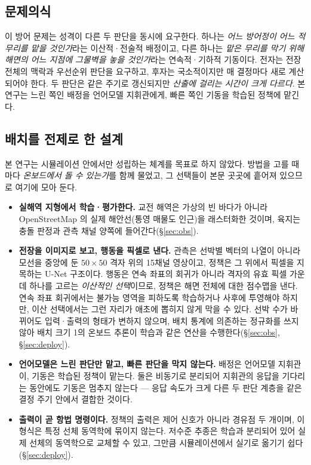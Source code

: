\subsection{문제의식}

이 방어 문제는 성격이 다른 두 판단을 동시에 요구한다. 하나는 \emph{어느 방어정이 어느
적 무리를 맡을 것인가}라는 이산적·전술적 배정이고, 다른 하나는 \emph{맡은 무리를 막기 위해
해면의 어느 지점에 그물벽을 놓을 것인가}라는 연속적·기하적 기동이다. 전자는 전장 전체의
맥락과 우선순위 판단을 요구하고, 후자는 국소적이지만 매 결정마다 새로 계산되어야 한다.
두 판단은 같은 주기로 갱신되지만 \emph{산출에 걸리는 시간이 크게 다르다}. 본 연구는 느린 쪽인 배정을 언어모델 지휘관에게, 빠른 쪽인 기동을 학습된 정책에 맡긴다.

\subsection{배치를 전제로 한 설계}

본 연구는 시뮬레이션 안에서만 성립하는 체계를 목표로 하지 않았다. 방법을 고를 때마다
\emph{온보드에서 돌 수 있는가}를 함께 물었고, 그 선택들이 본문 곳곳에 흩어져 있으므로
여기에 모아 둔다.

\begin{itemize}[leftmargin=*, itemsep=2pt, topsep=3pt]
\item \textbf{실해역 지형에서 학습·평가한다.} 교전 해역은 가상의 빈 바다가 아니라
      OpenStreetMap 의 실제 해안선(통영 매물도 인근)을 래스터화한 것이며, 육지는 충돌
      판정과 관측 채널 양쪽에 들어간다(\S\ref{sec:obs}).
\item \textbf{전장을 이미지로 보고, 행동을 픽셀로 낸다.} 관측은 선박별 벡터의 나열이
      아니라 모선을 중앙에 둔 $50\times50$ 격자 위의 15채널 영상이고, 정책은 그 위에서
      픽셀을 지목하는 U-Net 구조이다. 행동은 연속 좌표의 회귀가 아니라 격자의 유효 픽셀
      가운데 하나를 고르는 \emph{이산적인 선택}이므로, 정책은 해면 전체에 대한 점수맵을
      낸다. 연속 좌표 회귀에서는 불가능 영역을 피하도록 학습하거나 사후에 투영해야 하지만,
      이산 선택에서는 그런 자리가 애초에 뽑히지 않게 막을 수 있다. 선박 수가 바뀌어도
      입력·출력의 형태가 변하지 않으며, 배치 통계에 의존하는 정규화를 쓰지 않아 배치 크기
      1의 온보드 추론이 학습과 같은 연산을 수행한다(\S\ref{sec:obs}, \S\ref{sec:deploy}).
\item \textbf{언어모델은 느린 판단만 맡고, 빠른 판단을 막지 않는다.} 배정은 언어모델
      지휘관이, 기동은 학습된 정책이 맡는다. 둘은 비동기로 분리되어 지휘관의 응답을
      기다리는 동안에도 기동은 멈추지 않는다 --- 응답 속도가 크게 다른 두 판단 계층을
      같은 결정 주기 안에서 결합한 것이다.
\item \textbf{출력이 곧 항법 명령이다.} 정책의 출력은 제어 신호가 아니라 경유점 두 개이며,
      이 형식은 특정 선체 동역학에 묶이지 않는다. 저수준 추종은 학습과 분리되어 있어
      실제 선체의 동역학으로 교체할 수 있고, 그만큼 시뮬레이션에서 실기로 옮기기 쉽다
      (\S\ref{sec:deploy}).
\end{itemize}

